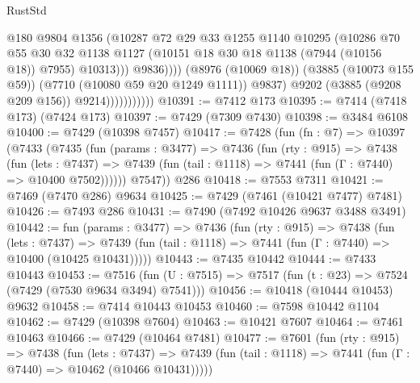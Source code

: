 \begin{lexlean}{RustStd}
\begin{coremodule}
                                      @180
                                      @9804
                                      @1356
                                      (@10287
                                        @72
                                        @29
                                        @33
                                        @1255
                                        @1140
                                        @10295
                                        (@10286
                                          @70
                                          @55
                                          @30
                                          @32
                                          @1138
                                          @1127
                                          (@10151 @18 @30 @18 @1138 (@7944 (@10156 @18)) @7955)
                                          @10313)))
                                    @9836))))
                            (@8976 (@10069 @18))
                            (@3885 (@10073 @155 @59))
                            (@7710 (@10080 @59 @20 @1249 @1111))
                            @9837)
                          @9202
                          (@3885 (@9208 @209 @156))
                          @9214)))))))))))
@10391 := @7412 @173
@10395 := @7414 (@7418 @173) (@7424 @173)
@10397 := @7429 (@7309 @7430)
@10398 := @3484 @6108
@10400 := @7429 (@10398 @7457)
@10417 := @7428
    (fun (fn : @7) =>
    @10397
      (@7433
        (@7435
          (fun (params : @3477) =>
          @7436
            (fun (rty : @915) =>
            @7438
              (fun (lets : @7437) =>
              @7439 (fun (tail : @1118) => @7441 (fun (Γ : @7440) => @10400 @7502))))))
        @7547))
    @286
@10418 := @7553 @7311
@10421 := @7469 (@7470 @286) @9634
@10425 := @7429 (@7461 (@10421 @7477) @7481)
@10426 := @7493 @286
@10431 := @7490 (@7492 @10426 @9637 @3488 @3491)
@10442 := fun (params : @3477) =>
  @7436
    (fun (rty : @915) =>
    @7438
      (fun (lets : @7437) =>
      @7439 (fun (tail : @1118) => @7441 (fun (Γ : @7440) => @10400 (@10425 @10431)))))
@10443 := @7435 @10442
@10444 := @7433 @10443
@10453 := @7516
    (fun (U : @7515) => @7517 (fun (t : @23) => @7524 (@7429 (@7530 @9634 @3494) @7541)))
@10456 := @10418 (@10444 @10453) @9632
@10458 := @7414 @10443 @10453
@10460 := @7598 @10442 @1104
@10462 := @7429 (@10398 @7604)
@10463 := @10421 @7607
@10464 := @7461 @10463
@10466 := @7429 (@10464 @7481)
@10477 := @7601
    (fun (rty : @915) =>
    @7438
      (fun (lets : @7437) =>
      @7439 (fun (tail : @1118) => @7441 (fun (Γ : @7440) => @10462 (@10466 @10431)))))

\end{coremodule}
\end{lexlean}
